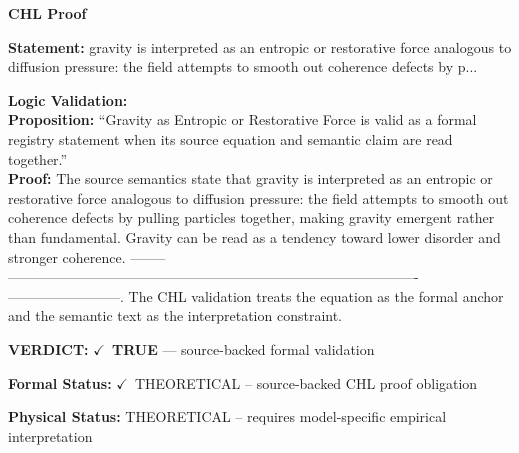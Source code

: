 \vspace{0.45em}
\noindent\textbf{CHL Proof}\par
\textbf{Statement:} gravity is interpreted as an entropic or restorative force analogous to diffusion
pressure: the field attempts to smooth out coherence defects by p...

\textbf{Logic Validation:}\\
\textbf{Proposition:} ``Gravity as Entropic or Restorative Force is valid as a formal registry statement when
its source equation and semantic claim are read together.''\\
\textbf{Proof:} The source semantics state that gravity is interpreted as an entropic or restorative
force analogous to diffusion pressure: the field attempts to smooth out coherence
defects by pulling particles together, making gravity emergent rather than fundamental.
Gravity can be read as a tendency toward lower disorder and stronger coherence. --------
----------------------------------------------------------------------------------------
------------------------. The CHL validation treats the equation as the formal anchor
and the semantic text as the interpretation constraint.

\textbf{VERDICT:} \ensuremath{\checkmark}\ \textbf{TRUE} --- source-backed formal validation

\textbf{Formal Status:} \ensuremath{\checkmark}\ THEORETICAL -- source-backed CHL proof obligation

\textbf{Physical Status:} THEORETICAL -- requires model-specific empirical interpretation
\par\vspace{0.45em}
\par
\ifTZPDarkEdition
{}
\fi
\endgroup
\endgroup
